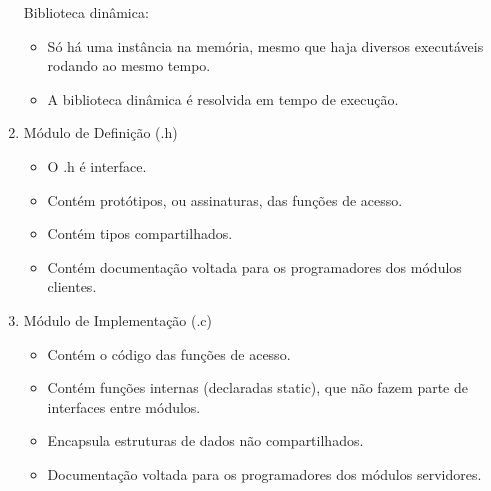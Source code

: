\documentclass[
	12pt, %
]{fphw}
\begin{document}
\begin{doublespace}
\begin{enumerate}
\begin{itemize}
        \end{itemize}

        Biblioteca dinâmica:

        \begin{itemize}

            \item Só há uma instância na memória, mesmo que haja diversos executáveis rodando ao mesmo tempo.
            \item A biblioteca dinâmica é resolvida em tempo de execução.
            
        \end{itemize}

        \item Módulo de Definição (.h)
        
        \begin{itemize}

            \item O .h é interface.
            \item Contém protótipos, ou assinaturas, das funções de acesso.
            \item Contém tipos compartilhados.
            \item Contém documentação voltada para os programadores dos módulos clientes.
            
        \end{itemize}

        \item Módulo de Implementação (.c)
        
        \begin{itemize}

            \item Contém o código das funções de acesso.
            \item Contém funções internas (declaradas static), que não fazem parte de interfaces entre módulos.
            \item Encapsula estruturas de dados não compartilhados.
            \item Documentação voltada para os programadores dos módulos servidores.
            
        \end{itemize}

    \end{enumerate}

\end{doublespace}


\end{document}
